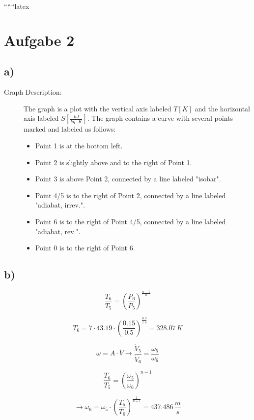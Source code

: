 
``````latex


\section*{Aufgabe 2}

\subsection*{a)}

\begin{description}
    \item[Graph Description:] The graph is a plot with the vertical axis labeled \( T[K] \) and the horizontal axis labeled \( S \left[ \frac{kJ}{kg \cdot K} \right] \). The graph contains a curve with several points marked and labeled as follows:
    \begin{itemize}
        \item Point 1 is at the bottom left.
        \item Point 2 is slightly above and to the right of Point 1.
        \item Point 3 is above Point 2, connected by a line labeled "isobar".
        \item Point 4/5 is to the right of Point 2, connected by a line labeled "adiabat, irrev.".
        \item Point 6 is to the right of Point 4/5, connected by a line labeled "adiabat, rev.".
        \item Point 0 is to the right of Point 6.
    \end{itemize}
\end{description}

\subsection*{b)}

\[
\frac{T_6}{T_5} = \left( \frac{P_6}{P_5} \right)^{\frac{n-1}{n}}
\]

\[
T_6 = 7 \cdot 43.19 \cdot \left( \frac{0.15}{0.5} \right)^{\frac{0.9}{1.4}} = 328.07 \, K
\]

\[
\omega = A \cdot \dot{V} \rightarrow \frac{\dot{V}_5}{\dot{V}_6} = \frac{\omega_5}{\omega_6}
\]

\[
\frac{T_6}{T_5} = \left( \frac{\omega_5}{\omega_6} \right)^{n-1}
\]

\[
\rightarrow \omega_6 = \omega_5 \cdot \left( \frac{T_5}{T_6} \right)^{\frac{1}{n-1}} = 437.486 \, \frac{m}{s}
\]

